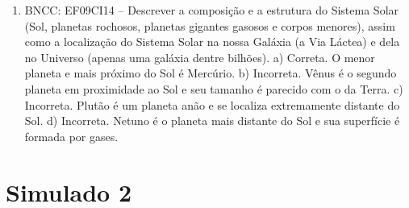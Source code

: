 \begin{enumerate}
\item
BNCC: EF09CI14 -- Descrever a composição e a
estrutura do Sistema Solar (Sol, planetas rochosos, planetas gigantes
gasosos e corpos menores), assim como a localização do Sistema Solar na
nossa Galáxia (a Via Láctea) e dela no Universo (apenas uma galáxia dentre bilhões).
a)  Correta. O menor planeta e mais próximo do Sol é Mercúrio.
b)  Incorreta. Vênus é o segundo planeta em proximidade ao Sol e seu tamanho é parecido com o da Terra.
c)  Incorreta. Plutão é um planeta anão e se localiza extremamente distante do Sol.
d)  Incorreta. Netuno é o planeta mais distante do Sol e sua superfície é formada por gases.
\end{enumerate}

\section*{Simulado 2}

